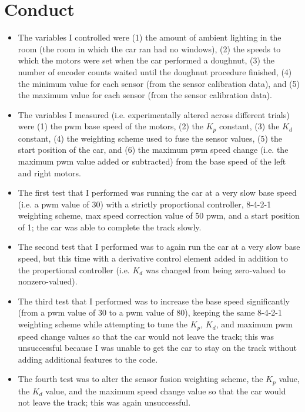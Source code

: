 \documentclass{article}
\begin{document}
\section{Conduct}

\begin{itemize}
    \item The variables I controlled were (1) the amount of ambient lighting in the room (the room in which the car ran had no windows), (2) the speeds to which the motors were set when the car performed a doughnut, (3) the number of encoder counts waited until the doughnut procedure finished, (4) the minimum value for each sensor (from the sensor calibration data), and (5) the maximum value for each sensor (from the sensor calibration data).
    
    \item The variables I measured (i.e. experimentally altered across different trials) were (1) the pwm base speed of the motors, (2) the \(K_p\) constant, (3) the \(K_d\) constant, (4) the weighting scheme used to fuse the sensor values, (5) the start position of the car, and (6) the maximum pwm speed change (i.e. the maximum pwm value added or subtracted) from the base speed of the left and right motors.
    
    \item The first test that I performed was running the car at a very slow base speed (i.e. a pwm value of 30) with a strictly proportional controller, 8-4-2-1 weighting scheme, max speed correction value of 50 pwm, and a start position of 1; the car was able to complete the track slowly.
    
    \item The second test that I performed was to again run the car at a very slow base speed, but this time with a derivative control element added in addition to the propertional controller (i.e. \(K_d\) was changed from being zero-valued to nonzero-valued).
    
    \item The third test that I performed was to increase the base speed significantly (from a pwm value of 30 to a pwm value of 80), keeping the same 8-4-2-1 weighting scheme while attempting to tune the \(K_p\), \(K_d\), and maximum pwm speed change values so that the car would not leave the track; this was unsuccessful because I was unable to get the car to stay on the track without adding additional features to the code.
    
    \item The fourth test was to alter the sensor fusion weighting scheme, the \(K_p\) value, the \(K_d\) value, and the maximum speed change value so that the car would not leave the track; this was again unsuccessful.
    

\end{itemize}
\end{document}
